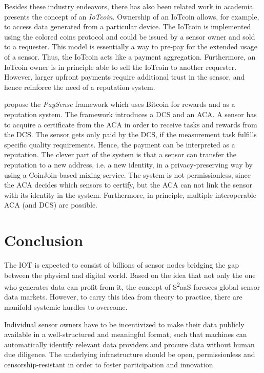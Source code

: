 Besides these industry endeavors, there has also been related work in academia. \cite{7073830} presents the concept of an \emph{IoTcoin}. Ownership of an IoTcoin allows, for example, to access data generated from a particular device. The IoTcoin is implemented using the colored coins protocol and could be issued by a sensor owner and sold to a requester. This model is essentially a way to pre-pay for the extended usage of a sensor. Thus, the IoTcoin acts like a payment aggregation. Furthermore, an IoTcoin owner is in principle able to sell the IoTcoin to another requester. However, larger upfront payments require additional trust in the sensor, and hence reinforce the need of a reputation system.

\cite{s16060776} propose the \emph{PaySense} framework which uses Bitcoin for rewards and as a reputation system. The framework introduces a \ac{DCS} and an \ac{ACA}. A sensor has to acquire a certificate from the \ac{ACA} in order to receive tasks and rewards from the \ac{DCS}. The sensor gets only paid by the \ac{DCS}, if the measurement task fulfills specific quality requirements. Hence, the payment can be interpreted as a reputation. The clever part of the system is that a sensor can transfer the reputation to a new address, i.e. a new identity, in a privacy-preserving way by using a CoinJoin-based mixing service. The system is not permissionless, since the \ac{ACA} decides which sensors to certify, but the \ac{ACA} can not link the sensor with its identity in the system. Furthermore, in principle, multiple interoperable \ac{ACA} (and \ac{DCS}) are possible. 
 

\section{Conclusion}
\label{sec:s2aas_conclusion}

The \ac{IOT} is expected to consist of billions of sensor nodes bridging the gap between the physical and digital world. Based on the idea that not only the one who generates data can profit from it, the concept of S\textsuperscript{2}aaS foresees global sensor data markets. However, to carry this idea from theory to practice, there are manifold systemic hurdles to overcome.

Individual sensor owners have to be incentivized to make their data publicly available in a well-structured and meaningful format, such that machines can automatically identify relevant data providers and procure data without human due diligence. The underlying infrastructure should be open, permissionless and censorship-resistant in order to foster participation and innovation. 

